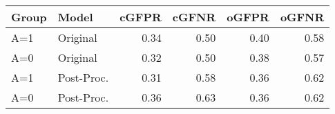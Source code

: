 \begin{tabular}{llrrrr}
  \hline
Group & Model & cGFPR & cGFNR & oGFPR & oGFNR \\ 
  \hline
A=1 & Original & 0.34 & 0.50 & 0.40 & 0.58 \\ 
  A=0 & Original & 0.32 & 0.50 & 0.38 & 0.57 \\ 
  A=1 & Post-Proc. & 0.31 & 0.58 & 0.36 & 0.62 \\ 
  A=0 & Post-Proc. & 0.36 & 0.63 & 0.36 & 0.62 \\ 
   \hline
\end{tabular}
